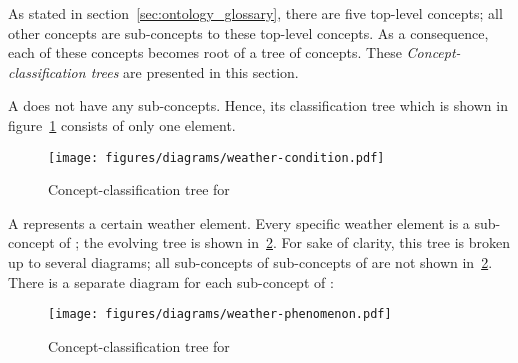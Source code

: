 As stated in section~\ref{sec:ontology_glossary}, there are five top-level concepts; all other concepts are sub-concepts to these top-level concepts. As a consequence, each of these concepts becomes root of a tree of concepts. These \emph{Concept-classification trees} are presented in this section.

A  does not have any sub-concepts. Hence, its classification tree which is shown in figure~\ref{fig:tree_weather_condition} consists of only one element.

\begin{figure}
  \centering
  \texttt{[image: figures/diagrams/weather-condition.pdf]}
  \caption{Concept-classification tree for }
  \label{fig:tree_weather_condition}
\end{figure}

A  represents a certain weather element. Every specific weather element is a sub-concept of ; the evolving tree is shown in~\ref{fig:tree_weather_phenomenon}. For sake of clarity, this tree is broken up to several diagrams; all sub-concepts of sub-concepts of  are not shown in~\ref{fig:tree_weather_phenomenon}. There is a separate diagram for each sub-concept of :

\begin{figure}
  \centering
  \texttt{[image: figures/diagrams/weather-phenomenon.pdf]}
  \caption{Concept-classification tree for }
  \label{fig:tree_weather_phenomenon}
\end{figure}

